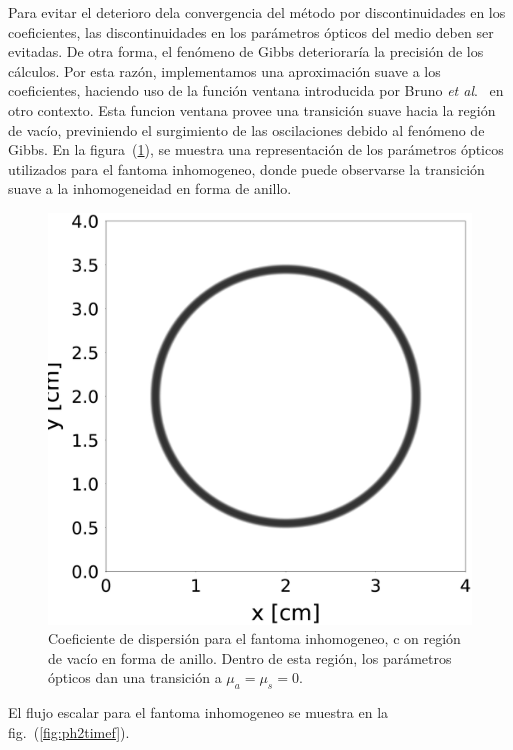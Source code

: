 Para evitar el deterioro dela convergencia del método por discontinuidades 
en los coeficientes, las discontinuidades en los parámetros ópticos del medio 
deben ser evitadas. De otra forma, el fenómeno de Gibbs deterioraría 
la precisión de los cálculos. Por esta razón, implementamos una aproximación 
suave a los coeficientes, haciendo uso de la función ventana introducida 
por Bruno \textit{et al}.~\cite{Bruno2014a} en otro contexto. 
Esta funcion ventana provee una transición suave hacia la región de 
vacío, previniendo el surgimiento de las oscilaciones debido al 
fenómeno de Gibbs. 
En la figura~(\ref{fig:scattcoef}), se muestra una representación de los 
parámetros ópticos utilizados para el fantoma inhomogeneo, 
donde puede observarse la transición suave a la inhomogeneidad 
en forma de anillo.
 \begin{figure}[h!]
\centering
  \includegraphics[width=0.35\linewidth]{figuras/sigs.eps}
  \caption{Coeficiente de dispersión para el fantoma inhomogeneo, c
  on región de vacío en forma de anillo. Dentro de esta región, 
  los parámetros ópticos dan una transición a  $\mu_a=\mu_s=0$.}
 \label{fig:scattcoef}
\end{figure}
El flujo escalar para el fantoma inhomogeneo se muestra en la fig.~(\ref{fig:ph2timef}). 
